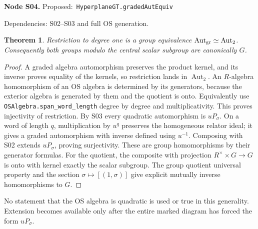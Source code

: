 \documentclass[11pt]{article}
\newtheorem{theorem}{Theorem}[section]
\theoremstyle{remark}\newtheorem{remark}[theorem]{Remark}
\newcommand{\Aut}{\operatorname{Aut}}
\newcommand{\code}[1]{\nolinkurl{#1}}
\newcommand{\node}[3]{\par\Needspace{8\baselineskip}\smallskip\noindent\textbf{Node #1.}\quad
 \textsf{Proposed:}\ \code{#2}\par\noindent
 \textsf{Dependencies:} #3.\par\smallskip}
\begin{document}
\node{S04}{HyperplaneGT.gradedAutEquiv}{S02--S03 and full OS generation}
\begin{theorem}\label{thm:s04}
Restriction to degree one is a group equivalence
$\Aut_{\rm gr}\simeq\Aut_2$. Consequently both groups modulo
the central scalar subgroup are canonically $G$.
\end{theorem}
\begin{proof}
A graded algebra automorphism preserves the product kernel,
and its inverse proves equality of the kernels, so restriction
lands in $\Aut_2$. An $R$-algebra homomorphism of an OS algebra
is determined by its generators, because the exterior algebra
is generated by them and the quotient is onto. Equivalently
use \code{OSAlgebra.span_word_length} degree by degree and
multiplicativity. This proves injectivity of restriction.
By S03 every quadratic automorphism is $uP_\sigma$. On a word
of length $q$, multiplication by $u^q$ preserves the homogeneous
relator ideal; it gives a graded automorphism with inverse
defined using $u^{-1}$. Composing with S02 extends $uP_\sigma$,
proving surjectivity. These are group homomorphisms by their
generator formulas. For the quotient, the composite with
projection $R^\times\times G\to G$ is onto with kernel exactly
the scalar subgroup. The group quotient universal property and
the section $\sigma\mapsto[(1,\sigma)]$ give explicit mutually
inverse homomorphisms to $G$.
\end{proof}
No statement that the OS algebra is quadratic is used or true
in this generality. Extension becomes available only after the
entire marked diagram has forced the form $uP_\sigma$.
\end{document}
